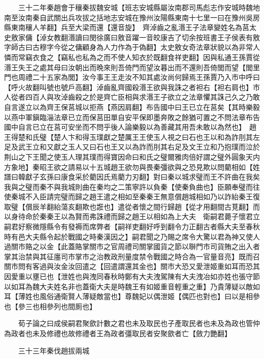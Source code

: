　　三十二年秦趙會于穰秦拔魏安城【班志安城縣屬汝南郡司馬彪志作安城時魏地南至汝南秦自武關出兵攻拔之括地志安城在豫州汝陽縣東南十七里一曰在豫州吳房縣東南穰人羊翻】兵至大梁而還【還音旋】　齊淖齒之亂湣王子法章變姓名為莒太史敫家傭【淖女教翻湣讀曰閔徐廣曰敫音躍一音皎康吉了切余按班書王子侯表有敫字師古曰古穆字今從之傭顧身為人力作為于偽翻】太史敫女奇法章狀貌以為非常人憐而常竊衣食之【竊私也私為之而不使人知衣於既翻食祥吏翻】因與私通王孫賈從湣王失王之處其母曰汝朝出而晩來則吾倚門而望汝暮出而不還則吾倚閭而望【閭里門也周禮二十五家為閭】汝今事王王走汝不知其處汝尚何歸焉王孫賈乃入市中呼曰【呼火故翻叫號也號戶高翻】淖齒亂齊國殺湣王欲與我誅之者袒右【袒右肩也】市人從者四百人與攻淖齒殺之於是齊亡臣相與求湣王子欲立之法章懼其誅己久之乃敢自言遂立以為齊王保莒城以拒燕【燕因肩翻】布告國中曰王已立在莒矣【其時樂毅以燕中軍鎭臨淄法章已立而保莒田單自安平保即墨奔敗之餘猶可置之不問法章布告國中自言已立在莒可安坐而不問乎後人論樂毅以為善藏其用吾未敢以為然也】　趙王得楚和氏璧【楚人卞和得玉璞獻之楚厲王王使玉人視之曰石也王以和為詐刖其左足及武王立和又獻之玉人又曰石也王又以為詐而刖其右足及文王立和乃抱璞而泣於荆山之下王聞之使玉人理其璞而得寶因命曰和氏之璧爾雅肉倍好謂之璧外圓象天内方象地】秦昭王欲之請易以十五城趙王欲勿與畏秦彊欲與之恐見欺以問藺相如【姓譜曰韓獻子玄孫曰康食采於藺因氏焉藺力刃翻】對曰秦以城求璧而王不許曲在我矣我與之璧而秦不與我城則曲在秦均之二策寧許以負秦【使秦負曲也】臣願奉璧而往使秦城不入臣請完璧而歸之趙王遣之相如至秦秦王無意償趙城相如乃以詐紿秦王復取璧【償辰羊翻紿蕩亥翻欺也誑也】遣從者懷之間行歸趙【從才用翻間古莧翻】而以身待命於秦秦王以為賢而弗誅禮而歸之趙王以相如為上大夫　衛嗣君薨子懷君立嗣君好察微隱縣令有發褥而席弊者【嗣祥吏翻好呼到翻令力正翻古者縣大夫至春秋時有邑大夫縣令起於戰國之時秦漢因之】嗣君聞之乃賜之席令大驚以君為神又使人過關市賂之以金【此蓋賂掌關市之官周禮司關掌國貨之節以聨門市司貨賄之出入者掌其治禁與其征廛司市掌市之治教政刑量度禁令戰國之時合為一官量音亮】既而召關市問有客過與汝金汝回遣之【回遣謂還其金也】關市大恐又愛泄姬重如耳而恐其因愛重以壅已也【泄姓也與洩同春秋時鄭有大夫洩駕陳有大夫洩冶如亦姓也張守節以如耳為魏大夫姓名非也蓋衛大夫是時魏王有如姬重音輕重之重】乃貴薄疑以敵如耳【薄姓也風俗通衛賢人薄疑敵當也】尊魏妃以偶泄姬【偶匹也對也】曰以是相參也【參三也相參列也間厠也】

　　荀子論之曰成侯嗣君聚歛計數之君也未及取民也子產取民者也未及為政也管仲為政者也未及修禮也故修禮者王為政者彊取民者安聚歛者亡【斂力艷翻】

　　三十三年秦伐趙拔兩城

